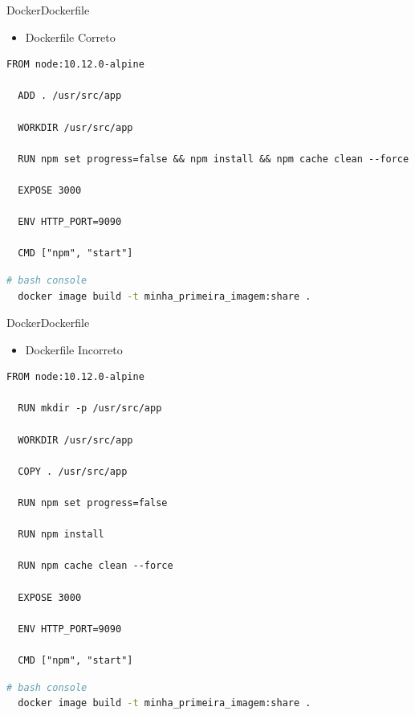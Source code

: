 \begin{frame}[fragile]{Docker}{Dockerfile}
  \begin{itemize}
    \item<1-> Dockerfile Correto
  \end{itemize}
  \begin{lstlisting}[language=docker]
  FROM node:10.12.0-alpine

  ADD . /usr/src/app

  WORKDIR /usr/src/app

  RUN npm set progress=false && npm install && npm cache clean --force

  EXPOSE 3000

  ENV HTTP_PORT=9090

  CMD ["npm", "start"]
  \end{lstlisting}
  \begin{lstlisting}[language=bash]
  # bash console
  docker image build -t minha_primeira_imagem:share .
  \end{lstlisting}
\end{frame}

\begin{frame}[fragile]{Docker}{Dockerfile}
  \begin{itemize}
    \item<1-> Dockerfile Incorreto
  \end{itemize}
  \begin{lstlisting}[language=docker]
  FROM node:10.12.0-alpine

  RUN mkdir -p /usr/src/app

  WORKDIR /usr/src/app

  COPY . /usr/src/app

  RUN npm set progress=false

  RUN npm install

  RUN npm cache clean --force

  EXPOSE 3000

  ENV HTTP_PORT=9090

  CMD ["npm", "start"]
  \end{lstlisting}
  \begin{lstlisting}[language=bash]
  # bash console
  docker image build -t minha_primeira_imagem:share .
  \end{lstlisting}
\end{frame}



